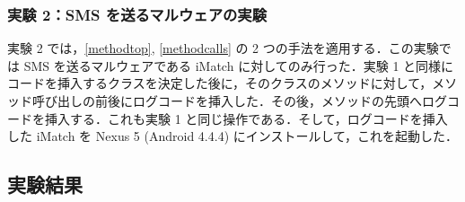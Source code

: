 \subsubsection{実験 2：SMS  を送るマルウェアの実験}
\label{exp2}
実験 2 では，\ref{methodtop}, \ref{methodcalls} の 2 つの手法を適用する．この実験では SMS を送るマルウェアである iMatch に対してのみ行った．実験 1 と同様にコードを挿入するクラスを決定した後に，そのクラスのメソッドに対して，メソッド呼び出しの前後にログコードを挿入した．その後，メソッドの先頭へログコードを挿入する．これも実験 1 と同じ操作である．そして，ログコードを挿入した iMatch を Nexus 5 (Android 4.4.4) にインストールして，これを起動した．

\subsection{実験結果}
